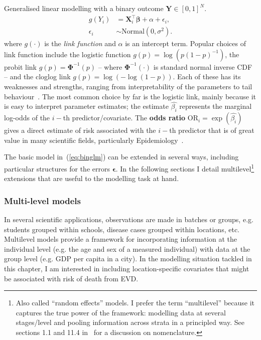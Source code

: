 Generalised linear modelling  with a binary outcome $\boldsymbol Y \in [0, 1]^N$.
\begin{align}
 \label{eq:binglm}
 g(Y_i) &= \boldsymbol X_i^\intercal \boldsymbol\beta + \alpha  + \epsilon_i,\\
 \epsilon_i &\sim \text{Normal}(0, \sigma^2).
\end{align} 
where $g(\cdot)$ is the \textit{link function} and $\alpha$ is an intercept term.
Popular choices of link function include the logistic function $g(p) = \log\left(p(1-p)^{-1} \right)$, the probit link $g(p) = \boldsymbol\Phi^{-1}(p)$ -- where  $\boldsymbol\Phi^{-1}(\cdot)$ is standard normal inverse CDF -- and the cloglog link $g(p) = \log(-\log(1-p))$.
Each of these has its weaknesses and strengths, ranging from interpretability of the parameters to tail behaviour~\citep{Czado2006}.
The most common choice by far is the logistic link, mainly because it is easy to interpret parameter estimates; the estimate $\hat{\beta_i}$ represents the marginal log-odds of the $i-$th predictor/covariate.
The \textbf{odds ratio} $\text{OR}_i = \exp(\hat{\beta_i})$ gives a direct estimate of risk associated with the $i-$th predictor that is of great value in many scientific fields, particularly Epidemiology~\citep{Schmidt2008}.

The basic model in~(\ref{eq:binglm}) can be extended in several ways, including particular structures for the errors $\boldsymbol\epsilon$. 
In the following sections I detail multilevel\footnote{Also called ``random effects'' models. I prefer the term ``multilevel'' because it captures the true power of the framework: modelling data at several stages/level and pooling information across strata in a principled way. See sections 1.1 and 11.4 in~\cite{Hill2007} for a discussion on nomenclature.} extensions that are useful to the modelling task at hand.

\subsubsection{Multi-level models}
\label{sec:multilevel}

In several scientific applications, observations are made in batches or groups, e.g. students grouped within schools, disease cases grouped within locations, etc.
Multilevel models provide a framework for incorporating information at the individual level (e.g. the age and sex of a measured individual) with data at the group level (e.g. GDP per capita in a city)\citep{Hill2007}.
In the modelling situation tackled in this chapter, I am interested in including location-specific covariates that might be associated with risk of death from EVD.

